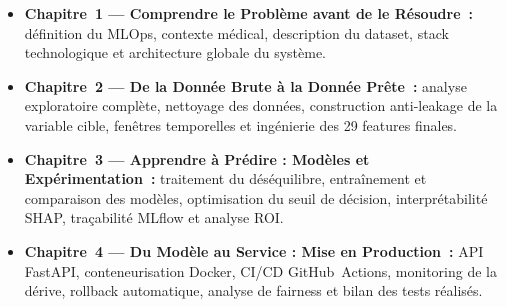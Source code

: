 \begin{itemize}
  \item \textbf{Chapitre~1 — Comprendre le Problème avant de le Résoudre~:}
        définition du MLOps, contexte médical, description du dataset, stack
        technologique et architecture globale du système.

  \item \textbf{Chapitre~2 — De la Donnée Brute à la Donnée Prête~:}
        analyse exploratoire complète, nettoyage des données, construction
        anti-leakage de la variable cible, fenêtres temporelles et ingénierie
        des 29 features finales.

  \item \textbf{Chapitre~3 — Apprendre à Prédire : Modèles et Expérimentation~:}
        traitement du déséquilibre, entraînement et comparaison des modèles,
        optimisation du seuil de décision, interprétabilité SHAP, traçabilité
        MLflow et analyse ROI.

  \item \textbf{Chapitre~4 — Du Modèle au Service : Mise en Production~:}
        API FastAPI, conteneurisation Docker, CI/CD GitHub~Actions, monitoring
        de la dérive, rollback automatique, analyse de fairness et bilan des
        tests réalisés.
\end{itemize}
